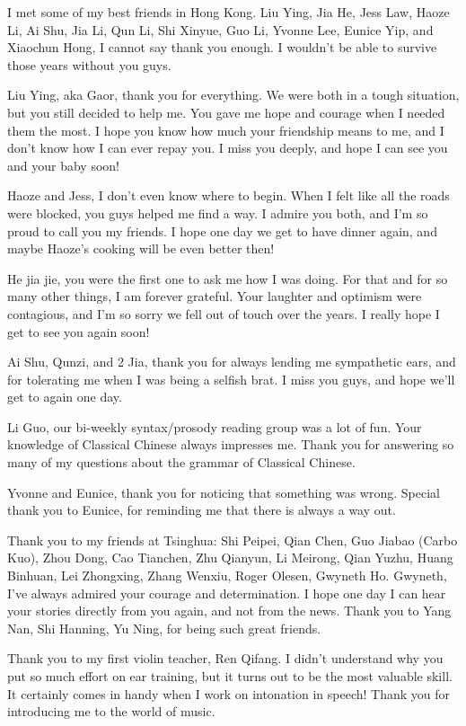  
I met some of my best friends in Hong Kong. Liu Ying, Jia He, Jess Law, Haoze Li, Ai Shu, Jia Li, Qun Li, Shi Xinyue, Guo Li, Yvonne Lee, Eunice Yip, and Xiaochun Hong, I cannot say thank you enough. I wouldn’t be able to survive those years without you guys.
 
Liu Ying, aka Gaor, thank you for everything. We were both in a tough situation, but you still decided to help me. You gave me hope and courage when I needed them the most. I hope you know how much your friendship means to me, and I don’t know how I can ever repay you. I miss you deeply, and hope I can see you and your baby soon!
 
Haoze and Jess, I don’t even know where to begin. When I felt like all the roads were blocked, you guys helped me find a way. I admire you both, and I'm so proud to call you my friends. I hope one day we get to have dinner again, and maybe Haoze’s cooking will be even better then!
 
He jia jie, you were the first one to ask me how I was doing. For that and for so many other things, I am forever grateful. Your laughter and optimism were contagious, and I’m so sorry we fell out of touch over the years. I really hope I get to see you again soon!
 
Ai Shu, Qunzi, and 2 Jia, thank you for always lending me sympathetic ears, and for tolerating me when I was being a selfish brat. I miss you guys, and hope we’ll get to  again one day.

Li Guo, our bi-weekly syntax/prosody reading group was a lot of fun. Your knowledge of Classical Chinese always impresses me. Thank you for answering so many of my questions about the grammar of Classical Chinese.
 
Yvonne and Eunice, thank you for noticing that something was wrong. Special thank you to Eunice, for reminding me that there is always a way out. 
 
Thank you to my friends at Tsinghua: Shi Peipei, Qian Chen, Guo Jiabao (Carbo Kuo), Zhou Dong, Cao Tianchen, Zhu Qianyun, Li Meirong, Qian Yuzhu, Huang Binhuan, Lei Zhongxing, Zhang Wenxiu, Roger Olesen, Gwyneth Ho. Gwyneth, I’ve always admired your courage and determination. I hope one day I can hear your stories directly from you again, and not from the news. Thank you to Yang Nan, Shi Hanning, Yu Ning, for being such great friends.

Thank you to my first violin teacher, Ren Qifang. I didn't understand why you put so much effort on ear training, but it turns out to be the most valuable skill. It certainly comes in handy when I work on intonation in speech! Thank you for introducing me to the world of music. 

